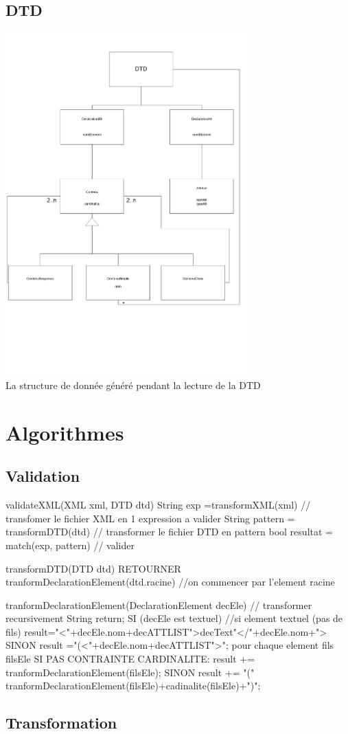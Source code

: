     \subsection{DTD}
        \includegraphics[width=0.7\textwidth]{img/ClassesDTD.pdf}\\
        La structure de donnée généré pendant la lecture de la DTD
        
\section{Algorithmes}

    \subsection{Validation}
	
	validateXML(XML xml, DTD dtd){
		String exp =transformXML(xml) // transfomer le fichier XML en 1 expression a valider
		String pattern = transformDTD(dtd) // transformer le fichier DTD en pattern 
		bool resultat = match(exp, pattern) // valider 		
	}

	transformDTD(DTD dtd){
		RETOURNER tranformDeclarationElement(dtd.racine) //on commencer par l'element racine
	}

	tranformDeclarationElement(DeclarationElement decEle) // transformer recursivement 
	{
		String return;
		SI (decEle est textuel) //si element textuel (pas de fils)
		{
			result="<"+decEle.nom+decATTLIST">decText"</"+decEle.nom+">
		}
		SINON
		{
			result ="(<"+decEle.nom+decATTLIST">";
			pour chaque element fils filsEle{
				SI PAS CONTRAINTE CARDINALITE:
					result += tranformDeclarationElement(filsEle);
				SINON
					result += "(" tranformDeclarationElement(filsEle)+cadinalite(filsEle)+")";
			}	
		}
	}

        
    \subsection{Transformation}

